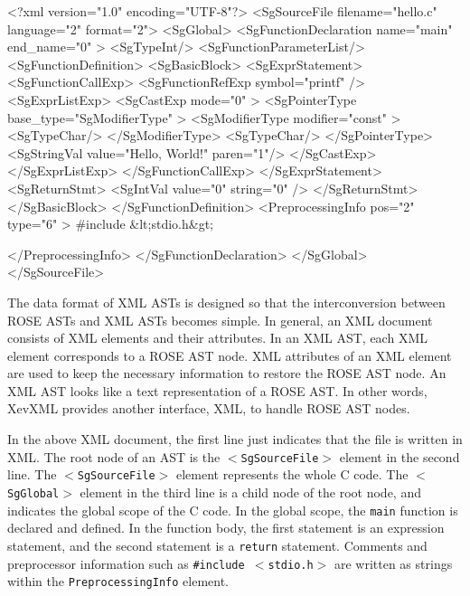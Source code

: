 \begin{framed}
\begin{src}
<?xml version="1.0" encoding="UTF-8"?>
<SgSourceFile filename="hello.c" language="2" format="2">
  <SgGlobal>
    <SgFunctionDeclaration name="main"  end_name="0" >
        <SgTypeInt/>
      <SgFunctionParameterList/>
      <SgFunctionDefinition>
        <SgBasicBlock>
          <SgExprStatement>
            <SgFunctionCallExp>
              <SgFunctionRefExp symbol="printf" />
              <SgExprListExp>
                <SgCastExp mode="0" >
                    <SgPointerType base_type="SgModifierType" >
                      <SgModifierType modifier="const" >
                        <SgTypeChar/>
                      </SgModifierType>
                      <SgTypeChar/>
                    </SgPointerType>
                  <SgStringVal value="Hello, World!\n" paren="1"/>
                </SgCastExp>
              </SgExprListExp>
            </SgFunctionCallExp>
          </SgExprStatement>
          <SgReturnStmt>
            <SgIntVal value="0"  string="0" />
          </SgReturnStmt>
        </SgBasicBlock>
      </SgFunctionDefinition>
<PreprocessingInfo pos="2"  type="6" >
#include &lt;stdio.h&gt;

</PreprocessingInfo>
    </SgFunctionDeclaration>
  </SgGlobal>
</SgSourceFile>
\end{src}
\end{framed}

The data format of XML ASTs is designed so that the interconversion
between ROSE ASTs and XML ASTs becomes simple.  In general, an XML
document consists of XML elements and their attributes. In an XML AST,
each XML element corresponds to a ROSE AST node. XML attributes of an
XML element are used to keep the necessary information to restore the
ROSE AST node.  An XML AST looks like a text representation of a ROSE
AST.  In other words, XevXML provides another interface, XML, to handle
ROSE AST nodes.

In the above XML document, the first line just indicates that the file
is written in XML.  The root node of an AST is the \texttt{$<$SgSourceFile$>$}
element in the second line. The \texttt{$<$SgSourceFile$>$} element represents
the whole C code.  The \texttt{$<$SgGlobal$>$} element in the third line is a
child node of the root node, and indicates the global scope of the C
code. In the global scope, the \texttt{main} function is declared and
defined. In the function body, the first statement is an expression
statement, and the second statement is a \texttt{return}
statement. Comments and preprocessor information such as
\texttt{\#include $<$stdio.h$>$} are written as strings within the
\texttt{PreprocessingInfo} element.

